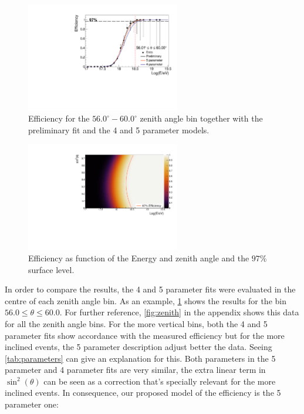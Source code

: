 \documentclass[12pt,a4paper]{article}
\begin{document}
\begin{figure}[h]
    \begin{center}
        \includegraphics[width=0.6\textwidth]{plots/singleZenithFit.pdf}
        \caption{Efficiency for the $56.0^{\circ}-60.0^{\circ}$ zenith angle bin together with the preliminary fit and the 4 and 5 parameter models.
        \label{fig:zenithSingle}}
        \vspace{-0.5cm}
    \end{center}
\end{figure}

\begin{figure}[h]
    \begin{center}
        \includegraphics[width=0.6\textwidth]{plots/Surface.pdf}
        \caption{Efficiency as function of the Energy and zenith angle and the $97\%$ surface level.
        \label{fig:surface}}
        \vspace{-0.5cm}
    \end{center}
\end{figure}

In order to compare the results, the 4 and 5 parameter fits were evaluated in the centre of each zenith angle bin. As an example, \cref{fig:zenithSingle} shows the results for the bin $56.0 \leq \theta \leq 60.0$. For further reference, \cref{fig:zenith} in the appendix shows this data for all the zenith angle bins. For the more vertical bins, both the 4 and 5 parameter fits show accordance with the measured efficiency but for the more inclined events, the 5 parameter description adjust better the data. Seeing \ref{tab:parameters} can give an explanation for this. Both parameters in the 5 parameter and 4 parameter fits are very similar, the extra linear term in $\sin^2(\theta)$ can be seen as a correction that's specially relevant for the more inclined events. In consequence, our proposed model of the efficiency is the 5 parameter one:
\end{document}

